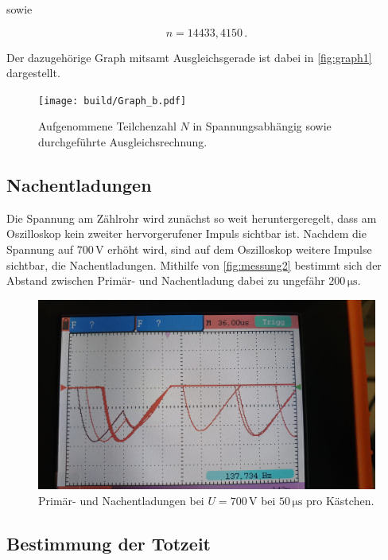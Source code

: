sowie

\begin{equation*}
      n = 14433,4150 \,.
\end{equation*}

Der dazugehörige Graph mitsamt Ausgleichsgerade ist dabei in \autoref{fig:graph1} dargestellt.

\begin{figure}
    \centering
    \texttt{[image: build/Graph\_b.pdf]}
    \caption{Aufgenommene Teilchenzahl $N$ in Spannungsabhängig sowie durchgeführte Ausgleichsrechnung.}
    \label{fig:graph1}
\end{figure}


\subsection{Nachentladungen}

Die Spannung am Zählrohr wird zunächst so weit heruntergeregelt, dass am Oszilloskop kein zweiter hervorgerufener Impuls sichtbar ist.
Nachdem die Spannung auf $700 \,\unit{\volt}$ erhöht wird, sind auf dem Oszilloskop weitere Impulse sichtbar, die Nachentladungen.
Mithilfe von \autoref{fig:messung2} bestimmt sich der Abstand zwischen Primär- und Nachentladung dabei zu ungefähr $200 \,\unit{\micro\second}$.

\begin{figure}
    \centering
    \includegraphics[scale=0.2]{figures/messung2.jpeg}
    \caption{Primär- und Nachentladungen bei $U = 700 \,\unit{\volt}$ bei $50 \,\unit{\micro\second}$ pro Kästchen.}
    \label{fig:messung2}
\end{figure}


\subsection{Bestimmung der Totzeit}

